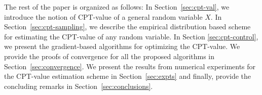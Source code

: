 The rest of the paper is organized as follows: 
In Section~\ref{sec:cpt-val}, we introduce the notion of CPT-value of a general random variable $X$.
In Section~\ref{sec:cpt-sampling}, we
describe the empirical distribution based scheme for estimating the CPT-value of any random variable. In Section \ref{sec:cpt-control}, we present the gradient-based algorithms for optimizing the CPT-value. 
We provide the proofs of convergence for all the proposed algorithms in Section~\ref{sec:convergence}.
We present the results from numerical experiments for the CPT-value estimation scheme in Section~\ref{sec:expts} and finally, provide the concluding remarks in Section~\ref{sec:conclusions}.
